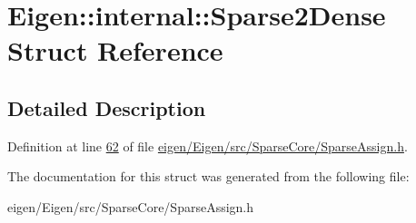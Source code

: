 \hypertarget{struct_eigen_1_1internal_1_1_sparse2_dense}{}\section{Eigen\+:\+:internal\+:\+:Sparse2\+Dense Struct Reference}
\label{struct_eigen_1_1internal_1_1_sparse2_dense}


\subsection{Detailed Description}


Definition at line \hyperlink{eigen_2_eigen_2src_2_sparse_core_2_sparse_assign_8h_source_l00062}{62} of file \hyperlink{eigen_2_eigen_2src_2_sparse_core_2_sparse_assign_8h_source}{eigen/\+Eigen/src/\+Sparse\+Core/\+Sparse\+Assign.\+h}.



The documentation for this struct was generated from the following file\+:\begin{DoxyCompactItemize}
\item 
eigen/\+Eigen/src/\+Sparse\+Core/\+Sparse\+Assign.\+h\end{DoxyCompactItemize}
